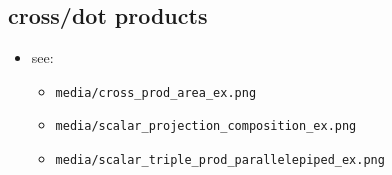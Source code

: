 \documentclass[11pt]{article}
\theoremstyle{definition}
\begin{document}
\subsection*{cross/dot products}
\begin{itemize}
  \item see:
  \begin{itemize}
    \item \texttt{media/cross\_prod\_area\_ex.png}
    \item \texttt{media/scalar\_projection\_composition\_ex.png}
    \item \texttt{media/scalar\_triple\_prod\_parallelepiped\_ex.png}
  \end{itemize}
\end{itemize}






\end{document}
